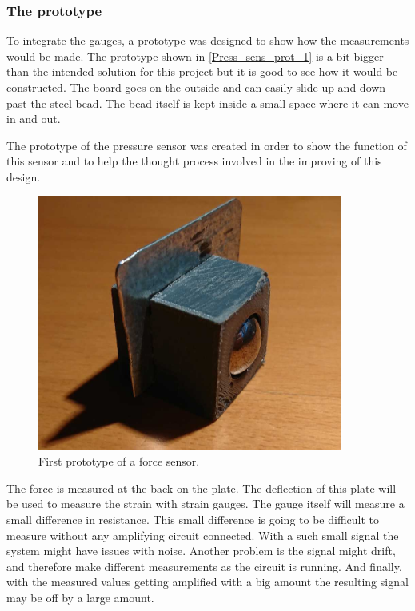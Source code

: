 \subsubsection{The prototype}
To integrate the gauges, a prototype was designed to show how the measurements would be made. The prototype shown in \autoref{Press_sens_prot_1} is a bit bigger than the intended solution for this project but it is good to see how it would be constructed. The board goes on the outside and can easily slide up and down past the steel bead. The bead itself is kept inside a small space where it can move in and out.

The prototype of the pressure sensor was created in order to show the function of this sensor and to help the thought process involved in the improving of this design.

\begin{figure}[H]
\begin{center}
	\includegraphics[width = 10cm]{Figures/Press_sens_prot_1.jpg}
	\caption{First prototype of a force sensor.}
	\label{Press_sens_prot_1}
\end{center}
\end{figure}

The force is measured at the back on the plate. The deflection of this plate will be used to measure the strain with strain gauges. 
The gauge itself will measure a small difference in resistance. This small difference is going to be difficult to measure without any amplifying circuit connected. With a such small signal the system might have issues with noise. Another problem is the signal might drift, and therefore make different measurements as the circuit is running. And finally, with the measured values getting amplified with a big amount the resulting signal may be off by a large amount. 

